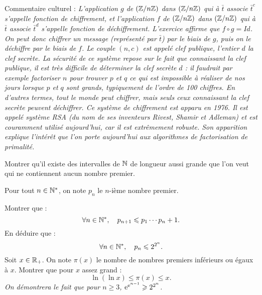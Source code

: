 \documentclass{magnolia}
\begin{document}
\begin{sol}
Commentaire culturel :
 {\it L'application $g$ de $(\mathbb{Z}/n\mathbb{Z})$ dans $(\mathbb{Z}/n\mathbb{Z})$ qui à $\bar{t}$ associe
 $\bar{t}^c$ s'appelle fonction de chiffrement, et l'application $f$ de
 $(\mathbb{Z}/n\mathbb{Z})$ dans $(\mathbb{Z}/n\mathbb{Z})$ qui à $\bar{t}$ associe $\bar{t}^d$ s'appelle
 fonction de déchiffrement. L'exercice affirme que $f\circ g=Id$. On peut donc
 chiffrer un message (représenté par $\bar{t}$) par le biais de $g$, puis on le
 déchiffre par le biais de $f$. Le couple $(n,c)$ est appelé clef publique,
 l'entier $d$ la clef secrète. La sécurité de ce système repose sur le fait que
 connaissant la clef publique, il est très difficile de déterminer la clef
 secrète $d$ : il faudrait par exemple factoriser $n$ pour trouver $p$ et $q$ ce
 qui est impossible à réaliser de nos jours lorsque $p$ et $q$ sont grands,
 typiquement de l'ordre de 100 chiffres. En d'autres termes, tout le monde peut
 chiffrer, mais seuls ceux connaissant la clef secrète peuvent déchiffrer. Ce
 système de chiffrement est apparu en 1976. Il est appelé système {\sc RSA} (du
 nom de ses inventeurs {\sc Rivest}, {\sc Shamir} et {\sc Adleman}) et est
 couramment utilisé aujourd'hui, car il est extrêmement robuste. Son apparition
 explique l'intérêt que l'on porte aujourd'hui aux algorithmes de factorisation
 de primalité.}
\end{sol}


Montrer qu'il existe des intervalles de $\mathbb{N}$ de longueur aussi grande que l'on
veut qui ne contiennent aucun nombre premier.

Pour tout $n\in{\mathbb{N}^*}$, on note $p_n$ le $n$-ième nombre premier.
\begin{questions}
\question  Montrer que :
  \[\forall n \in {\mathbb{N}^*} ,\quad p_{n+1} \leqslant p_1 \cdots p_n +1.\]
\question  En déduire que :
  \[\forall n \in {\mathbb{N}^*} ,\quad p_n \leqslant 2^{2^n}.\]
\question  Soit $x\in\mathbb{R}_+$. On note $\pi(x)$ le nombre de nombres premiers
  inférieurs ou égaux à $x$. Montrer que pour $x$ assez grand :
  \[\ln(\ln x) \leq \pi(x) \leq x.\]
  {\it On démontrera le fait que pour $n\geq3$, ${\rm e}^{{\rm e}^{n-1}} \geqslant 2^{2^n}$.}
\end{questions}
\end{document}
